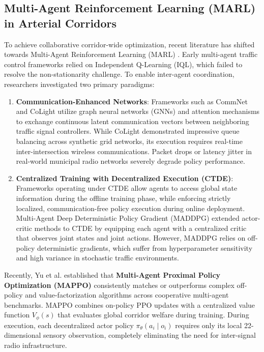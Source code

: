 \documentclass[12pt,a4paper,oneside]{report}
\begin{document}
\subsection{Multi-Agent Reinforcement Learning (MARL) in Arterial Corridors}
To achieve collaborative corridor-wide optimization, recent literature has shifted towards Multi-Agent Reinforcement Learning (MARL) \cite{ref_mappo2022}. Early multi-agent traffic control frameworks relied on Independent Q-Learning (IQL), which failed to resolve the non-stationarity challenge. To enable inter-agent coordination, researchers investigated two primary paradigms:
\begin{enumerate}
    \item \textbf{Communication-Enhanced Networks}: Frameworks such as CommNet \cite{ref_sukhbaatar2016} and CoLight \cite{ref_wei2019colight} utilize graph neural networks (GNNs) and attention mechanisms to exchange continuous latent communication vectors between neighboring traffic signal controllers. While CoLight demonstrated impressive queue balancing across synthetic grid networks, its execution requires real-time inter-intersection wireless communications. Packet drops or latency jitter in real-world municipal radio networks severely degrade policy performance.
    \item \textbf{Centralized Training with Decentralized Execution (CTDE)}: Frameworks operating under CTDE allow agents to access global state information during the offline training phase, while enforcing strictly localized, communication-free policy execution during online deployment. Multi-Agent Deep Deterministic Policy Gradient (MADDPG) \cite{ref_lowe2017} extended actor-critic methods to CTDE by equipping each agent with a centralized critic that observes joint states and joint actions. However, MADDPG relies on off-policy deterministic gradients, which suffer from hyperparameter sensitivity and high variance in stochastic traffic environments.
\end{enumerate}

Recently, Yu et al. \cite{ref_mappo2022} established that \textbf{Multi-Agent Proximal Policy Optimization (MAPPO)} consistently matches or outperforms complex off-policy and value-factorization algorithms across cooperative multi-agent benchmarks. MAPPO combines on-policy PPO updates with a centralized value function $V_\phi(s)$ that evaluates global corridor welfare during training. During execution, each decentralized actor policy $\pi_\theta(a_i \mid o_i)$ requires only its local 22-dimensional sensory observation, completely eliminating the need for inter-signal radio infrastructure.
\end{document}
